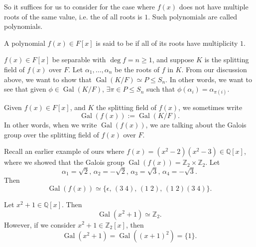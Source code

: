 \documentclass[notoc,notitlepage,nobib]{tufte-book}
\DeclareMathOperator{\Gal}{Gal}
\begin{document}
So it suffices for us to consider for the case where $f(x)$ does not have
multiple roots of the same value, i.e. the  of all roots
is $1$.  Such polynomials are called  polynomials.

\begin{defn}\label{defn:separable_polynomials}
  A polynomial $f(x) \in F[x]$ is said to be  if all of its
  roots have multiplicity $1$.
\end{defn}

 $f(x) \in F[x]$ be separable with $\deg f = n \geq 1$, and
suppose $K$ is the splitting field of $f(x)$ over $F$. Let $\alpha_1, \ldots,
\alpha_n$ be the roots of $f$ in $K$. From our discussion above, we want to show
that $\Gal(K / F) \simeq P \leq S_n$. In other words, we want to see that given
$\phi \in \Gal(K / F)$, $\exists \pi \in P \leq S_n$ such that $\phi(\alpha_i) =
\alpha_{\pi(i)}$.

\begin{notation}
  Given $f(x) \in F[x]$, and $K$ the splitting field of $f(x)$, we sometimes
  write
  \begin{equation*}
    \Gal(f(x)) := \Gal(K / F).
  \end{equation*}
  In other words, when we write $\Gal(f(x))$, we are talking about the Galois
  group over the splitting field of $f(x)$ over $F$.
\end{notation}

\begin{eg}
  Recall an earlier example of ours where $f(x) = (x^2 - 2)(x^2 - 3) \in
  \mathbb{Q}[x]$, where we showed that the Galois group $\Gal(f(x)) =
  \mathbb{Z}_2 \times \mathbb{Z}_2$. Let
  \begin{equation*}
    \alpha_1 = \sqrt{2}, \, \alpha_2 = - \sqrt{2}, \, \alpha_3 = \sqrt{3}, \,
    \alpha_4 = - \sqrt{3}.
  \end{equation*}
  Then
  \begin{equation*}
    \Gal(f(x)) \simeq \{ \epsilon, \, (3 \; 4), \, (1 \; 2), \, (1 \; 2)(3 \; 4)
    \}.
  \end{equation*}
\end{eg}

\begin{eg}
  Let $x^2 + 1 \in \mathbb{Q}[x]$. Then 
  \begin{equation*}
    \Gal(x^2 + 1) \simeq \mathbb{Z}_2.
  \end{equation*}
  However, if we consider $x^2 + 1 \in \mathbb{Z}_2[x]$, then
  \begin{equation*}
    \Gal(x^2 + 1) = \Gal((x + 1)^2) = \{ 1 \}.
  \end{equation*}
\end{eg}
\end{document}
